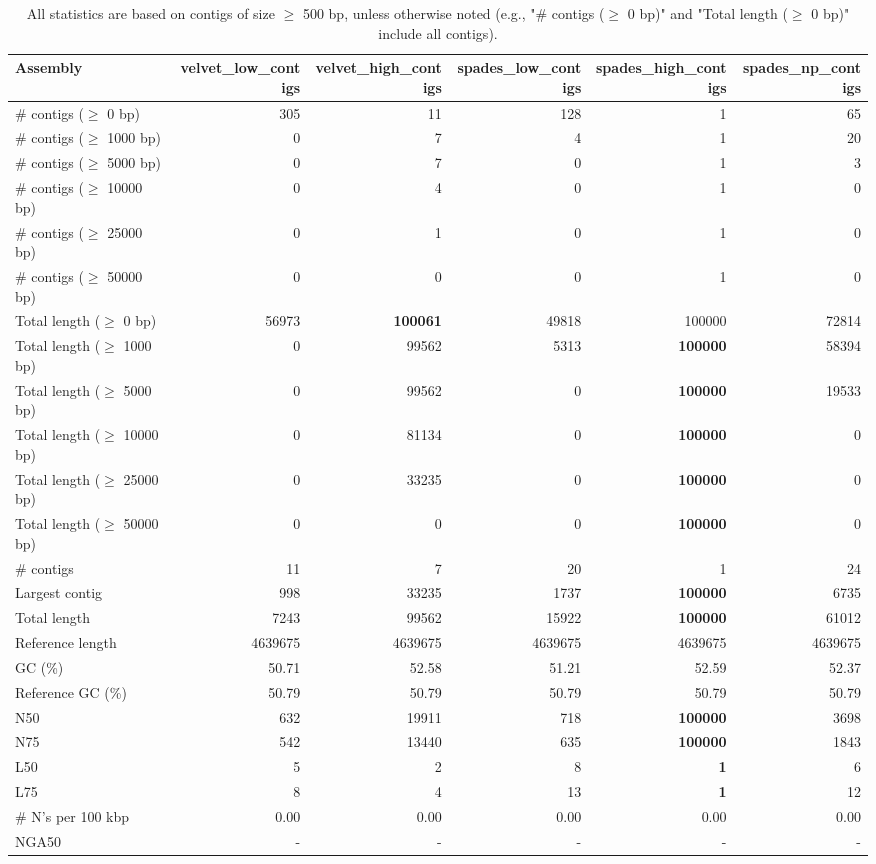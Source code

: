\documentclass[12pt,a4paper]{article}
\begin{document}
\begin{table}[ht]
\begin{center}
\caption{All statistics are based on contigs of size $\geq$ 500 bp, unless otherwise noted (e.g., "\# contigs ($\geq$ 0 bp)" and "Total length ($\geq$ 0 bp)" include all contigs).}
\begin{tabular}{|l*{5}{|r}|}
\hline
Assembly & velvet\_low\_contigs & velvet\_high\_contigs & spades\_low\_contigs & spades\_high\_contigs & spades\_np\_contigs \\ \hline
\# contigs ($\geq$ 0 bp) & 305 & 11 & 128 & 1 & 65 \\ \hline
\# contigs ($\geq$ 1000 bp) & 0 & 7 & 4 & 1 & 20 \\ \hline
\# contigs ($\geq$ 5000 bp) & 0 & 7 & 0 & 1 & 3 \\ \hline
\# contigs ($\geq$ 10000 bp) & 0 & 4 & 0 & 1 & 0 \\ \hline
\# contigs ($\geq$ 25000 bp) & 0 & 1 & 0 & 1 & 0 \\ \hline
\# contigs ($\geq$ 50000 bp) & 0 & 0 & 0 & 1 & 0 \\ \hline
Total length ($\geq$ 0 bp) & 56973 & {\bf 100061} & 49818 & 100000 & 72814 \\ \hline
Total length ($\geq$ 1000 bp) & 0 & 99562 & 5313 & {\bf 100000} & 58394 \\ \hline
Total length ($\geq$ 5000 bp) & 0 & 99562 & 0 & {\bf 100000} & 19533 \\ \hline
Total length ($\geq$ 10000 bp) & 0 & 81134 & 0 & {\bf 100000} & 0 \\ \hline
Total length ($\geq$ 25000 bp) & 0 & 33235 & 0 & {\bf 100000} & 0 \\ \hline
Total length ($\geq$ 50000 bp) & 0 & 0 & 0 & {\bf 100000} & 0 \\ \hline
\# contigs & 11 & 7 & 20 & 1 & 24 \\ \hline
Largest contig & 998 & 33235 & 1737 & {\bf 100000} & 6735 \\ \hline
Total length & 7243 & 99562 & 15922 & {\bf 100000} & 61012 \\ \hline
Reference length & 4639675 & 4639675 & 4639675 & 4639675 & 4639675 \\ \hline
GC (\%) & 50.71 & 52.58 & 51.21 & 52.59 & 52.37 \\ \hline
Reference GC (\%) & 50.79 & 50.79 & 50.79 & 50.79 & 50.79 \\ \hline
N50 & 632 & 19911 & 718 & {\bf 100000} & 3698 \\ \hline
N75 & 542 & 13440 & 635 & {\bf 100000} & 1843 \\ \hline
L50 & 5 & 2 & 8 & {\bf 1} & 6 \\ \hline
L75 & 8 & 4 & 13 & {\bf 1} & 12 \\ \hline
\# N's per 100 kbp & 0.00 & 0.00 & 0.00 & 0.00 & 0.00 \\ \hline
NGA50 & - & - & - & - & - \\ \hline
\end{tabular}
\end{center}
\end{table}
\end{document}

